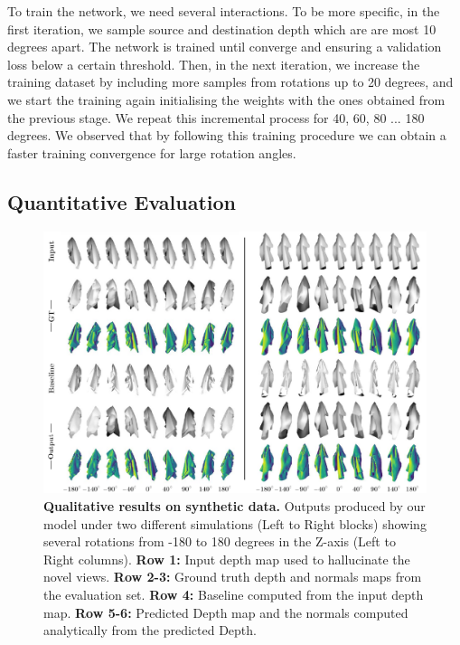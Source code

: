 To train the network, we need several interactions. To be more specific, in the first iteration, we sample source and destination depth which are are most 10 degrees apart.  The network is trained until converge and ensuring a validation loss below a certain threshold.  Then, in the next iteration, we increase the training dataset by including more samples from rotations up to 20 degrees, and we start the training again initialising the weights with the ones obtained from the previous stage. We repeat this incremental process for 40, 60, 80 ... 180 degrees. We observed that by following this training procedure we can obtain a faster training convergence for large rotation angles.   

\subsection{Quantitative Evaluation}

\begin{figure}
\begin{center}
    \includegraphics[width=\linewidth]{main/chapter04/data/ipalm_cvpr_grid_synth_vertical.pdf}
    \caption{\small{{\bf Qualitative results on synthetic data.} Outputs produced by our model under two different simulations (Left to Right blocks) showing several rotations from -180 to 180 degrees in the Z-axis (Left to Right columns). \textbf{Row 1:} Input depth map used to hallucinate the novel views. \textbf{Row 2-3:} Ground truth depth and normals maps from the evaluation set. \textbf{Row 4:} Baseline computed from the input depth map. \textbf{Row 5-6:} Predicted Depth map and the normals computed analytically from the predicted Depth.}}
    \label{fig_outputs_synthetic}
\end{center}
\end{figure}

